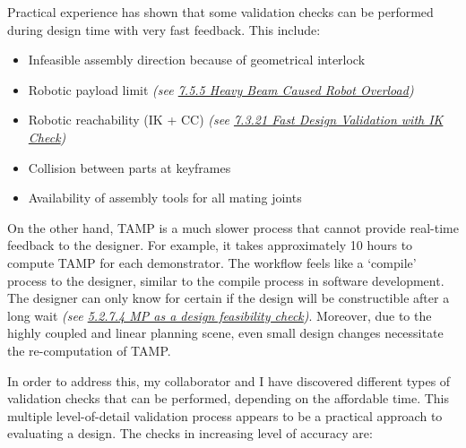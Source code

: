 \documentclass[11pt]{book}
\begin{document}
Practical experience has shown that some validation checks can be performed during design time with very fast feedback. This include: 

\begin{itemize}
	\item Infeasible assembly direction because of geometrical interlock

	\item Robotic payload limit \textit{(see \uline{7.5.5 Heavy Beam Caused Robot Overload})}

	\item Robotic reachability (IK + CC) \textit{(see \uline{7.3.21 Fast Design Validation with IK Check})}

	\item Collision between parts at keyframes

	\item Availability of assembly tools for all mating joints

\end{itemize}
On the other hand, TAMP is a much slower process that cannot provide real-time feedback to the designer. For example, it takes approximately 10 hours to compute TAMP for each demonstrator. The workflow feels like a ‘compile’ process to the designer, similar to the compile process in software development. The designer can only know for certain if the design will be constructible after a long wait \textit{(see \uline{5.2.7.4 MP as a design feasibility check})}. Moreover, due to the highly coupled and linear planning scene, even small design changes necessitate the re-computation of TAMP.

In order to address this, my collaborator and I have discovered different types of validation checks that can be performed, depending on the affordable time. This multiple level-of-detail validation process appears to be a practical approach to evaluating a design. The checks in increasing level of accuracy are:
\end{document}

